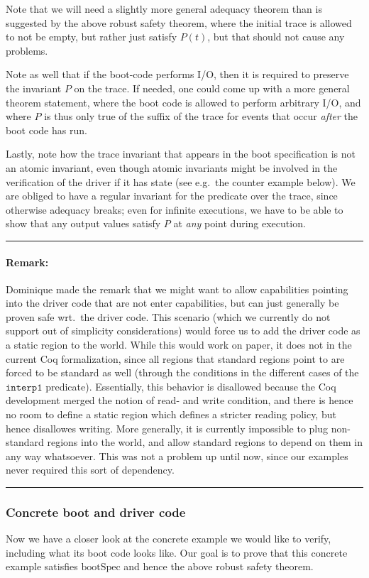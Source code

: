 \documentclass{article}
\newcommand{\X}[1]{\ensuremath{\mathrm{#1}}}
\newcommand{\I}[1]{\ensuremath{\mathtt{#1}}}
\newenvironment{remark}
{ \bigskip\hrule\vspace{-1.3em}\nobreak
  \paragraph*{Remark:}}
{\vspace*{0.5em}\hrule\medskip}
\begin{document}
Note that we will need a slightly more general adequacy theorem than is suggested by the above robust safety theorem, where the initial trace is
allowed to not be empty, but rather just satisfy $P(t)$, but that should not
cause any problems.

Note as well that if the boot-code performs I/O, then it is required to preserve
the invariant $P$ on the trace. If needed, one could come up with a more general
theorem statement, where the boot code is allowed to perform arbitrary I/O, and
where $P$ is thus only true of the suffix of the trace for events that occur
\emph{after} the boot code has run.

Lastly, note how the trace invariant that appears in the boot specification is not an atomic invariant, even though atomic invariants might be involved in the verification of the driver if it has state (see e.g.\ the counter example below). We are obliged to have a regular invariant for the predicate over the trace, since otherwise adequacy breaks; even for infinite executions, we have to be able to show that any output values satisfy $P$ at \emph{any} point during execution.

\begin{remark}
 Dominique made the remark that we might want to allow capabilities pointing
 into the driver code that are not enter capabilities, but can just generally be
 proven safe wrt.\ the driver code. This scenario (which we currently do not
 support out of simplicity considerations) would force us to add the driver code
 as a static region to the world. While this would work on paper, it does not in the
 current Coq formalization, since all regions that standard regions point to are
 forced to be standard as well (through the conditions in the different cases of
 the $\I{interp1}$ predicate). Essentially, this behavior is disallowed because
 the Coq development merged the notion of read- and write condition, and there
 is hence no room to define a static region which defines a stricter reading
 policy, but hence disallowes writing. More generally, it is currently
 impossible to plug non-standard regions into the world, and allow standard
 regions to depend on them in any way whatsoever. This was not a problem up
 until now, since our examples never required this sort of dependency.
\end{remark}

\subsubsection{Concrete boot and driver code}
\label{subsec:driverimpl}
Now we have a closer look at the concrete example we would like to verify,
including what its boot code looks like. Our goal is to prove that this concrete
example satisfies \X{bootSpec} and hence the above robust safety theorem.
\end{document}
